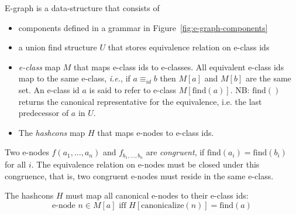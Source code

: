 \begin{definition}
    E-graph is a data-structure that consists of
    \begin{itemize}
        \item components defined in a grammar in Figure~\ref{fig:e-graph-components}
        \item a union find structure $U$ that stores equivalence relation on e-class ids
        \item \textit{e-class} map $M$ that maps e-class ids to e-classes. All equivalent e-class ids map to the same e-class, \textit{i.e.}, if $a \equiv_{id} b$ then $M[a]$ and $M[b]$ are the same set.
              An e-class id $a$ is said to refer to e-class $M[\text{find}(a)]$. NB: $\text{find}()$ returns the canonical representative for the equivalence, i.e. the last predecessor of $a$ in $U$.
        \item The \textit{hashcons} map $H$ that maps e-nodes to e-class ids.
    \end{itemize}
\end{definition}

\begin{definition}
Two e-nodes $f(a_{1}, \ldots, a_{n})$ and $f_{b_{1}, \ldots, b_{n}}$ are \textit{congruent}, if $\text{find}(a_{i}) = \text{find}(b_{i})$ for all $i$.
The equivalence relation on e-nodes must be closed under this congruence, that is, two congruent e-nodes must reside in the same e-class.
\end{definition}

\begin{definition}
The hashcons $H$ must map all canonical e-nodes to their e-class ids:
\[
\text{e-node } n \in M[a] \text{ iff } H[\text{canonicalize}(n)] = \text{find}(a)
\]
\end{definition}

